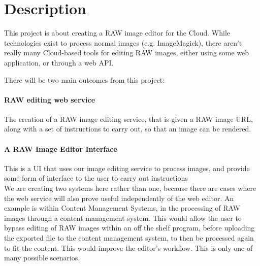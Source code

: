\documentclass[14pt]{article}
\begin{document}
\maketitle
\section{Description}
  This project is about creating a RAW image editor for the Cloud. While technologies
  exist to process normal images (e.g. ImageMagick), there aren't really many Cloud-based
  tools for editing RAW images, either using some web application, or through a web API.

  There will be two main outcomes from this project:

  \paragraph{RAW editing web service}
    The creation of a RAW image editing service, that is given a RAW image URL,
    along with a set of instructions to carry out, so that an image can be rendered.

  \paragraph{A RAW Image Editor Interface}
    This is a UI that uses our image editing service to process images, and provide
    some form of interface to the user to carry out instructions
    \\
    We are creating two systems here rather than one, because there are cases where the
    web service will also prove useful independently of the web editor. An example is within
    Content Management Systems, in the processing of RAW images through a content management system.
    This would allow the user to bypass editing of RAW images within an off the shelf program, before
    uploading the exported file to the content management system, to then be processed again to fit the content.
    This would improve the editor's workflow. This is only one of many possible scenarios.
\end{document}
